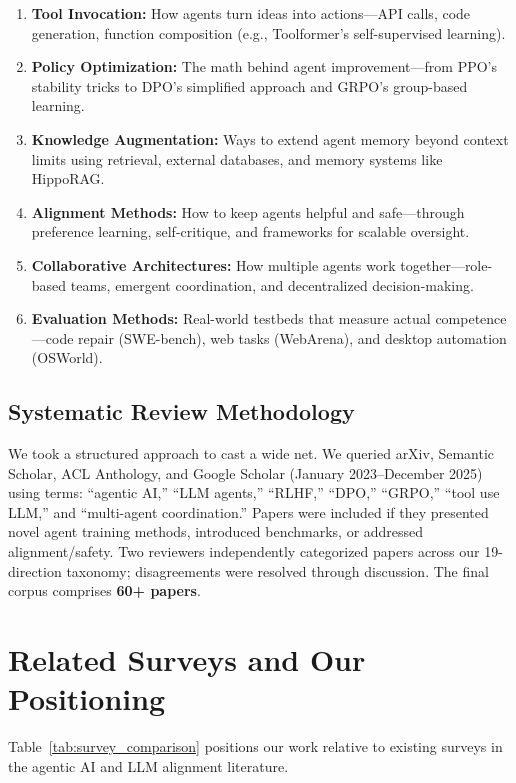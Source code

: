 \documentclass[12pt,a4paper]{report}
\theoremstyle{definition}
\begin{document}
\begin{enumerate}
    \item \textbf{Tool Invocation:} How agents turn ideas into actions---API calls, code generation, function composition (e.g., Toolformer's self-supervised learning).
    \item \textbf{Policy Optimization:} The math behind agent improvement---from PPO's stability tricks to DPO's simplified approach and GRPO's group-based learning.
    \item \textbf{Knowledge Augmentation:} Ways to extend agent memory beyond context limits using retrieval, external databases, and memory systems like HippoRAG.
    \item \textbf{Alignment Methods:} How to keep agents helpful and safe---through preference learning, self-critique, and frameworks for scalable oversight.
    \item \textbf{Collaborative Architectures:} How multiple agents work together---role-based teams, emergent coordination, and decentralized decision-making.
    \item \textbf{Evaluation Methods:} Real-world testbeds that measure actual competence---code repair (SWE-bench), web tasks (WebArena), and desktop automation (OSWorld).
\end{enumerate}

\subsection{Systematic Review Methodology}
We took a structured approach to cast a wide net. We queried arXiv, Semantic Scholar, ACL Anthology, and Google Scholar (January 2023--December 2025) using terms: ``agentic AI,'' ``LLM agents,'' ``RLHF,'' ``DPO,'' ``GRPO,'' ``tool use LLM,'' and ``multi-agent coordination.'' Papers were included if they presented novel agent training methods, introduced benchmarks, or addressed alignment/safety. Two reviewers independently categorized papers across our 19-direction taxonomy; disagreements were resolved through discussion. The final corpus comprises \textbf{60+ papers}.

\section{Related Surveys and Our Positioning}
Table~\ref{tab:survey_comparison} positions our work relative to existing surveys in the agentic AI and LLM alignment literature.
\end{document}
